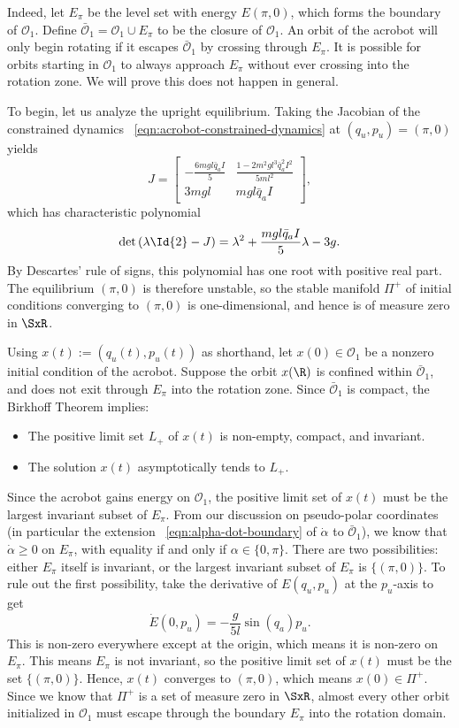 Indeed, let \(E_\pi\) be the level set with energy \(E(\pi,0)\), 
which forms the boundary of \(\mathcal{O}_1\). 
Define \(\bar{\mathcal{O}}_1 = \mathcal{O}_1 \cup E_\pi\) to be the closure of
\(\mathcal{O}_1\).
An orbit of the acrobot will only begin rotating if it escapes 
\(\bar{\mathcal{O}}_1\) by crossing through \(E_\pi\).
It is possible for orbits starting in \(\mathcal{O}_1\) to always approach
\(E_\pi\) without ever crossing into the rotation zone.
We will prove this does not happen in general.

To begin, let us analyze the upright equilibrium.
Taking the Jacobian of the constrained dynamics
~\eqref{eqn:acrobot-constrained-dynamics} at \((q_u,p_u) = (\pi,0)\) yields
\[
    J = \begin{bmatrix}
        -\frac{6mgl\bar{q}_aI}{5} & \frac{1 - 2m^2gl^3\bar{q}_a^2 I^2}{5ml^2} \\
        3mgl & mgl\bar{q}_aI
    \end{bmatrix}
    ,
\]
which has characteristic polynomial
\[
    \det\left(\lambda \Id{2} - J\right)
    = \lambda^2 + \frac{mgl\bar{q}_a I}{5} \lambda - 3g
    .
\]
By Descartes' rule of signs, this polynomial has one root with positive real
part. 
The equilibrium \((\pi,0)\) is therefore unstable, so the stable manifold \(\Pi^+\) of
initial conditions converging to \((\pi,0)\) is one-dimensional, and hence is
of measure zero in \(\SxR\).

Using \(x(t) := (q_u(t),p_u(t))\) as shorthand, let
\(x(0) \in \mathcal{O}_1\) be a nonzero initial condition of the acrobot.
Suppose the orbit \(x(\R)\) is confined within 
\(\bar{\mathcal{O}}_1\), and does not exit through \(E_\pi\) into the rotation
zone.
Since \(\bar{\mathcal{O}}_1\) is compact, the Birkhoff Theorem \cite{birkhoff}
implies:
\begin{itemize}
    \item The positive limit set \(L_+\) of \(x(t)\) is non-empty, compact, and
        invariant.
    \item The solution \(x(t)\) asymptotically tends to \(L_+\).
\end{itemize}
Since the acrobot gains energy on \(\mathcal{O}_1\), the positive limit set of
\(x(t)\) must be the largest invariant subset of \(E_\pi\). 
From our discussion on pseudo-polar coordinates (in particular the extension
~\eqref{eqn:alpha-dot-boundary} of \(\dot{\alpha}\) to \(\bar{\mathcal{O}}_1\)),
we know that \(\dot{\alpha} \geq 0\) on \(E_\pi\), with equality if and only if 
\(\alpha \in \{0,\pi\}\).
There are two possibilities: either \(E_\pi\) itself is invariant, or the
largest invariant subset of \(E_\pi\) is \(\{(\pi,0)\}\).
To rule out the first possibility, take the derivative of \(E(q_u,p_u)\) at the
\(p_u\)-axis to get
\[
    \dot{E}(0,p_u) = -\frac{g}{5l} \sin(q_a)p_u
    .
\]
This is non-zero everywhere except at the origin, which means it is non-zero on
\(E_\pi\). 
This means \(E_\pi\) is not invariant, so the positive limit set of \(x(t)\)
must be the set \(\{(\pi,0)\}\).
Hence, \(x(t)\) converges to \((\pi,0)\), which means \(x(0) \in \Pi^+\).
Since we know that \(\Pi^+\) is a set of measure zero in \(\SxR\), almost every
other orbit initialized in \(\mathcal{O}_1\) must escape through the boundary
\(E_\pi\) into the rotation domain.


